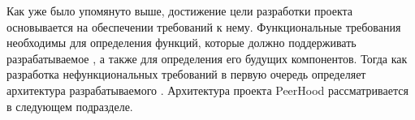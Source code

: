 \Sentence
Как уже было упомянуто выше, достижение цели разработки проекта основывается на обеспечении 
требований к нему.
\Sentence
Функциональные требования необходимы для определения функций, которые должно поддерживать 
разрабатываемое , а также для определения его будущих компонентов.
\Sentence
Тогда как разработка нефункциональных требований в первую очередь определяет архитектура 
разрабатываемого  .
\Sentence
Архитектура проекта PeerHood рассматривается в следующем подразделе.